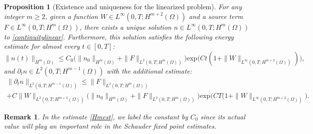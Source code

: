 \documentclass[12pt]{article}
\theoremstyle{plain}
\newtheorem{proposition}{Proposition}[section]
\newtheorem{remark}{Remark}[section]
\begin{document}
\begin{proposition}[Existence and uniqueness for the linearized problem]\label{linearestimate}
    For any integer $m \ge 2$, given a function $W \in L^{\infty}(0, T; H^{m + 2}(\Omega))$ and a source term $F \in L^{\infty}(0, T; H^{m}(\Omega))$, there exists a unique solution $n \in L^{\infty}(0, T; H^{m}(\Omega))$ to \eqref{continuitylinear}. Furthermore, this solution satisfies the following energy estimate for almost every $t \in [0, T]$:
    \begin{equation}\label{Hmest}
    \|n(t)\|_{H^{m}(\Omega)} \le C_{0}\Big(\|n_{0}\|_{H^{m}(\Omega)} + \|F\|_{L^{2}(0, T; H^{m}(\Omega))}\Big) \text{exp}\Big(Ct(1 + \|W\|_{L^{\infty}(0, T; H^{m + 2}(\Omega))})\Big),
    \end{equation}
    and $\partial_{t}n \in L^{2}(0, T; H^{m - 1}(\Omega))$ with the additional estimate:
    \begin{multline*}
        \|\partial_{t}n\|_{L^{2}(0, T; H^{m - 1}(\Omega))} \le \|F\|_{L^{2}(0, T; H^{m}(\Omega))} \\
        + C\|W\|_{L^{2}(0, T; H^{m + 2}(\Omega))}\Big(\|n_{0}\|_{H^{m}(\Omega)} + \|F\|_{L^{2}(0, T; H^{m}(\Omega))}\Big) \text{exp}\Big(CT(1 + \|W\|_{L^{\infty}(0, T; H^{m + 2}(\Omega))}\Big).
    \end{multline*}
\end{proposition}

\begin{remark}
In the estimate \eqref{Hmest}, we label the constant by $C_{0}$ since its actual value will play an important role in the Schauder fixed point estimates.
\end{remark}
\end{document}
